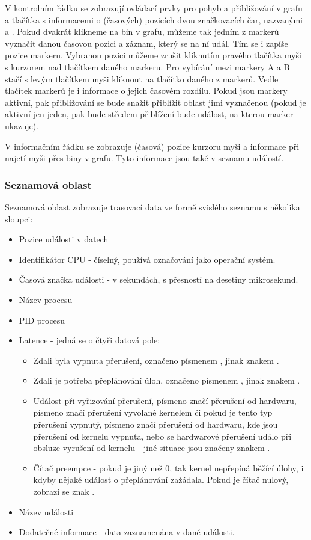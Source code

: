 V kontrolním řádku se zobrazují ovládací prvky pro pohyb a přibližování v grafu a tlačítka s informacemi o (časových) pozicích dvou značkovacích čar, nazvanými  a . Pokud dvakrát klikneme na bin v grafu, můžeme tak jedním z markerů vyznačit danou časovou pozici a záznam, který se na ní udál. Tím se i zapíše pozice markeru. Vybranou pozici můžeme zrušit kliknutím pravého tlačítka myši s kurzorem nad tlačítkem daného markeru. Pro vybírání mezi markery A a B stačí s levým tlačítkem myši kliknout na tlačítko daného z markerů. Vedle tlačítek markerů je i informace o jejich časovém rozdílu. Pokud jsou markery aktivní, pak přibližování se bude snažit přiblížit oblast jimi vyznačenou (pokud je aktivní jen jeden, pak bude středem přiblížení bude událost, na kterou marker ukazuje).

V informačním řádku se zobrazuje (časová) pozice kurzoru myši a informace při najetí myši přes biny v grafu. Tyto informace jsou také v seznamu událostí.

\subsubsection*{Seznamová oblast}
Seznamová oblast zobrazuje trasovací data ve formě svislého seznamu s několika sloupci:
\begin{itemize}
    \item Pozice události v datech
    \item Identifikátor CPU - číselný, používá označování jako operační systém.
    \item Časová značka události - v sekundách, s přesností na desetiny mikrosekund.
    \item Název procesu
    \item PID procesu
    \item Latence - jedná se o čtyři datová pole:
    \begin{itemize}
        \item Zdali byla vypnuta přerušení, označeno písmenem , jinak znakem .
        \item Zdali je potřeba přeplánování úloh, označeno písmenem , jinak znakem .
        \item Událost při vyřizování přerušení, písmeno  značí přerušení od hardwaru, písmeno  značí přerušení vyvolané kernelem či pokud je tento typ přerušení vypnutý, písmeno  značí přerušení od hardwaru, kde jsou přerušení od kernelu vypnuta, nebo se hardwarové přerušení událo při obsluze vyrušení od kernelu - jiné situace jsou značeny znakem .
        \item Čítač preempce - pokud je jiný než 0, tak kernel nepřepíná běžící úlohy, i kdyby nějaké událost o přeplánování zažádala. Pokud je čítač nulový, zobrazí se znak .
    \end{itemize}
    \item Název události
    \item Dodatečné informace - data zaznamenána v dané události. 
\end{itemize}

